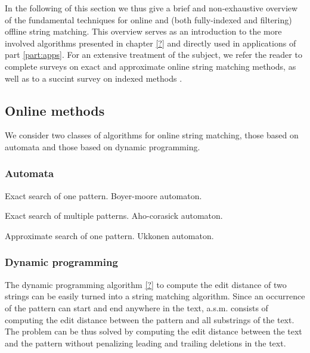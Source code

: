 In the following of this section we thus give a brief and non-exhaustive overview of the fundamental techniques for online and (both fully-indexed and filtering) offline string matching.
This overview serves as an introduction to the more involved algorithms presented in chapter \ref{?} and directly used in applications of part \ref{part:apps}.
For an extensive treatment of the subject, we refer the reader to complete surveys on exact \cite{Faro2013} and approximate \cite{Navarro1999} online string matching methods, as well as to a succint survey on indexed methods \cite{Navarro2001}.


\subsection{Online methods}

We consider two classes of algorithms for online string matching, those based on automata and those based on dynamic programming.

\subsubsection{Automata}

Exact search of one pattern. Boyer-moore automaton.

Exact search of multiple patterns. Aho-corasick automaton.

Approximate search of one pattern. Ukkonen automaton.


\subsubsection{Dynamic programming}

The dynamic programming algorithm \ref{?} to compute the edit distance of two strings can be easily turned into a string matching algorithm.
Since an occurrence of the pattern can start and end anywhere in the text, a.s.m. consists of computing the edit distance between the pattern and all substrings of the text.
The problem can be thus solved by computing the edit distance between the text and the pattern without penalizing leading and trailing deletions in the text.

